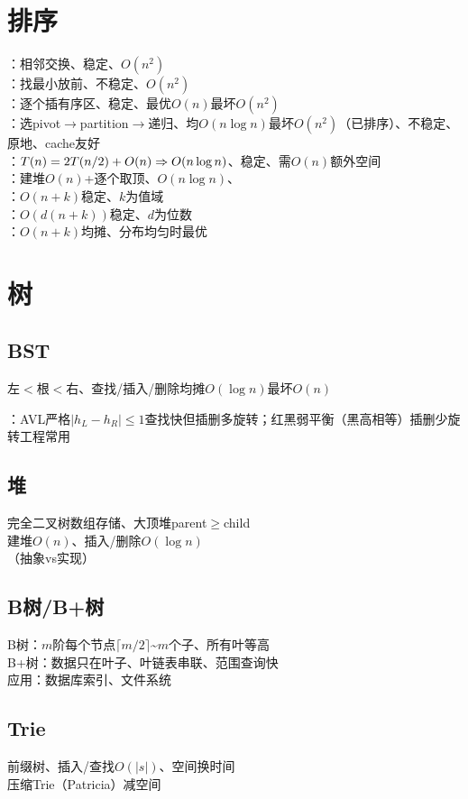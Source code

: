 \documentclass[lang=zh,cols=5,paper=a4,fontsize=6pt,scheme=classic]{../cheatsheet}
\begin{document}
\startcols

\section{排序}
：相邻交换、稳定、$O(n^2)$\\
：找最小放前、不稳定、$O(n^2)$\\
：逐个插有序区、稳定、最优$O(n)$最坏$O(n^2)$\\
：选pivot$\to$partition$\to$递归、均$O(n\log n)$最坏$O(n^2)$（已排序）、不稳定、原地、cache友好\\
：$T(n)=2T(n/2)+O(n)\Rightarrow O(n\log n)$、稳定、需$O(n)$额外空间\\
：建堆$O(n)$+逐个取顶、$O(n\log n)$、\\
：$O(n+k)$稳定、$k$为值域\\
：$O(d(n+k))$稳定、$d$为位数\\
：$O(n+k)$均摊、分布均匀时最优

\section{树}
\subsection{BST}
左$<$根$<$右、查找/插入/删除均摊$O(\log n)$最坏$O(n)$

：AVL严格$|h_L-h_R|\le1$查找快但插删多旋转；红黑弱平衡（黑高相等）插删少旋转工程常用

\subsection{堆}
完全二叉树数组存储、大顶堆parent$\ge$child\\
建堆$O(n)$、插入/删除$O(\log n)$\\
（抽象vs实现）

\subsection{B树/B+树}
B树：$m$阶每个节点$\lceil m/2\rceil$\textasciitilde$m$个子、所有叶等高\\
B+树：数据只在叶子、叶链表串联、范围查询快\\
应用：数据库索引、文件系统

\subsection{Trie}
前缀树、插入/查找$O(|s|)$、空间换时间\\
压缩Trie（Patricia）减空间
\end{document}
